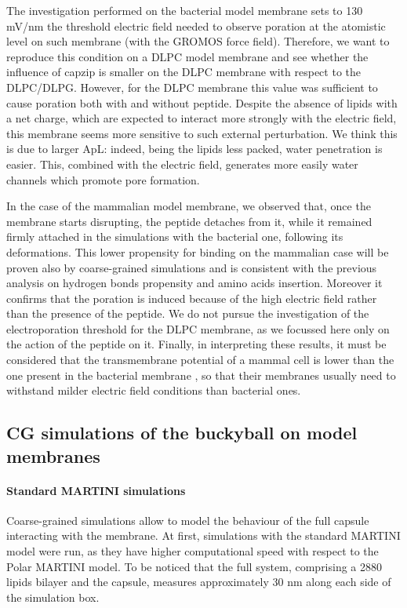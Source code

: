The investigation performed on the bacterial model membrane sets to 130 mV/nm the threshold electric field needed to observe poration at the atomistic level on such membrane (with the GROMOS force field). Therefore, we want to reproduce this condition on a DLPC model membrane and see whether the influence of capzip is smaller on the DLPC membrane with respect to the DLPC/DLPG.
%
However, for the DLPC membrane this value was sufficient to cause poration both with and without peptide. Despite the absence of lipids with a net charge, which are expected to interact more strongly with the electric field, this membrane seems more sensitive to such external perturbation. We think this is due to larger ApL: indeed, being the lipids less packed, water penetration is easier. This, combined with the electric field, generates more easily water channels which promote pore formation.

In the case of the mammalian model membrane, we observed that, once the membrane starts disrupting, the peptide detaches from it, while it remained firmly attached in the simulations with the bacterial one, following its deformations. This lower propensity for binding on the mammalian case will be proven also by coarse-grained simulations and is consistent with the previous analysis on hydrogen bonds propensity and amino acids insertion. Moreover it confirms that the poration is induced because of the high electric field rather than the presence of the peptide. We do not pursue the investigation of the electroporation threshold for the DLPC membrane, as we focussed here only on the action of the peptide on it.
%
Finally, in interpreting these results, it must be considered that the transmembrane potential of a mammal cell is lower than the one present in the bacterial membrane \citep{Yeaman2003,Wilson2011}, so that their membranes usually need to withstand milder electric field conditions than bacterial ones.


\subsection{CG simulations of the buckyball on model membranes} \label{sec:results_lip_cg}

\paragraph{Standard MARTINI simulations} Coarse-grained simulations allow to model the behaviour of the full capsule interacting with the membrane.
%
At first, simulations with the standard MARTINI model were run, as they have higher computational speed with respect to the Polar MARTINI model. To be noticed that the full system, comprising a 2880 lipids bilayer and the capsule, measures approximately 30 nm along each side of the simulation box.

